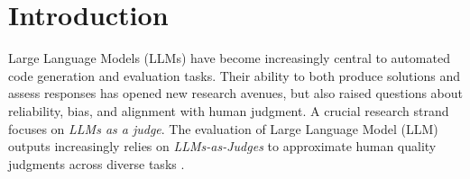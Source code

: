 \section{Introduction}
Large Language Models (LLMs) have become increasingly central to automated code generation and evaluation tasks. Their ability to both produce solutions and assess responses has opened new research avenues, but also raised questions about reliability, bias, and alignment with human judgment. A crucial research strand focuses on \textit{LLMs as a judge}. The evaluation of Large Language Model (LLM) outputs increasingly relies on \emph{LLMs-as-Judges} to approximate human quality judgments across diverse tasks \cite{li2024_llmsasjudges, zheng2023judgelm, bavaresco2024judgebench}. 